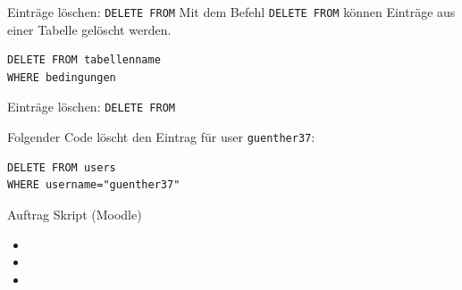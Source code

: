 \begin{frame}[fragile]{Einträge löschen: \texorpdfstring{\lstinline[style=sql]|DELETE FROM|}{DELETE FROM}}
Mit dem Befehl \lstinline[style=sql]|DELETE FROM| können Einträge aus einer Tabelle gelöscht werden.
\begin{lstlisting}[style=sql]
DELETE FROM tabellenname
WHERE bedingungen
\end{lstlisting}

\end{frame}

\begin{frame}[fragile]{Einträge löschen: \texorpdfstring{\lstinline[style=sql]|DELETE FROM|}{DELETE FROM}}

\begin{myexample}
Folgender Code löscht den Eintrag für user \texttt{guenther37}:
\begin{lstlisting}[style=sql]
DELETE FROM users
WHERE username="guenther37"
\end{lstlisting}
\end{myexample}
\end{frame}


\begin{frame}[fragile]{Auftrag}
Skript (Moodle)
\begin{itemize}
	\item {}
	\item {}
	\item {}
\end{itemize}
\end{frame}

